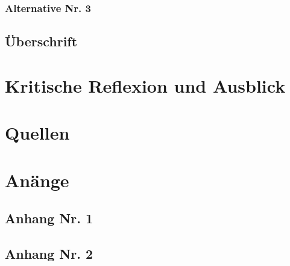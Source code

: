 \documentclass[12px, a4paper]{article}
\begin{document}
\begin{spacing}{1.5}
\subsubsection{Alternative Nr. 3}
\blindtext
\subsection{Überschrift}
\blindtext


\newpage
\section{Kritische Reflexion und Ausblick}
\Blindtext
\newpage


\newpage


\section{Quellen}
\renewcommand{\refname}{Literaturverzeichnis}

\listoffigures
\end{spacing}
\onecolumn
\newpage
\section{Anänge}


\subsection*{Anhang Nr. 1}
\newpage

\subsection*{Anhang Nr. 2}

\newpage
\end{document}
